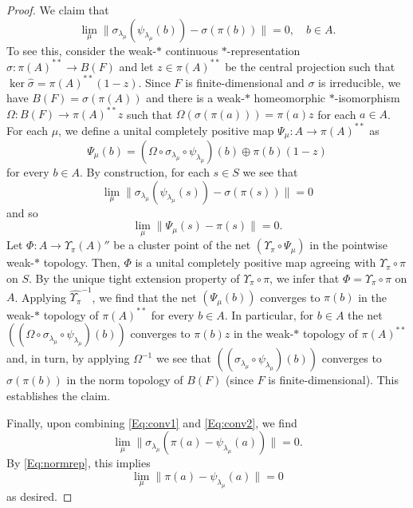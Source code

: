 \documentclass[10pt,a4paper]{amsart}
\begin{document}
\begin{proof}
We claim that 
\begin{equation}\label{Eq:conv2}
\lim_\mu \|\sigma_{\lambda_\mu}(\psi_{\lambda_\mu}(b))-\sigma(\pi(b))\|=0, \quad b\in A.
\end{equation}
To see this, consider the weak-$*$ continuous $*$-representation $\widehat\sigma:\pi(A)^{**}\to B(F)$ and let $z\in \pi(A)^{**}$ be the central projection such that $\ker \widehat\sigma=\pi(A)^{**}(1-z)$. Since $F$ is finite-dimensional and $\sigma$ is irreducible, we have $B(F)=\sigma(\pi(A))$ and there is a weak-$*$ homeomorphic $*$-isomorphism $\Omega:B(F)\to \pi(A)^{**}z$ such that $\Omega(\sigma(\pi(a)))=\pi(a)z$ for each $a\in A$.  For each $\mu$, we define a unital completely positive map $\Psi_\mu:A\to \pi(A)^{**}$ as
\[
\Psi_\mu(b)=(\Omega\circ \sigma_{\lambda_\mu} \circ \psi_{\lambda_\mu})(b)\oplus \pi(b)(1-z)
\]
for every $b\in A$. By construction, for each $s\in S$ we see that
\[
\lim_\mu \|\sigma_{\lambda_\mu}(\psi_{\lambda_\mu}(s))-\sigma(\pi(s))\|=0
\]
and so
\[
\lim_\mu \|\Psi_\mu(s)-\pi(s)\|=0.
\]
Let $\Phi:A\to \Upsilon_\pi(A)''$ be a cluster point of the net $(\Upsilon_\pi\circ \Psi_\mu)$ in the pointwise weak-$*$ topology. Then, $\Phi$ is a unital completely positive map agreeing with $\Upsilon_\pi\circ \pi$ on $S$. By the unique tight extension property of $\Upsilon_\pi\circ \pi$, we infer that $\Phi=\Upsilon_\pi\circ \pi$ on $A$. Applying $\widehat{\Upsilon_\pi}^{-1}$, we find that the net $(\Psi_\mu(b))$ converges to $\pi(b)$ in the weak-$*$ topology of $\pi(A)^{**}$ for every $b\in A$. In particular,  for $b\in A$ the net $((\Omega\circ \sigma_{\lambda_\mu} \circ \psi_{\lambda_\mu})(b))$ converges to $\pi(b)z$  in the weak-$*$ topology of $\pi(A)^{**}$ and, in turn, by applying $\Omega^{-1}$ we see that $((\sigma_{\lambda_\mu} \circ \psi_{\lambda_\mu})(b))$ converges to $\sigma(\pi(b))$  in the norm topology of $B(F)$ (since $F$ is finite-dimensional). This establishes the claim.

Finally, upon combining \eqref{Eq:conv1} and \eqref{Eq:conv2}, we find 
\[
\lim_\mu \|\sigma_{\lambda_\mu}(\pi(a)-\psi_{\lambda_\mu}(a))\|=0.
\]
By \eqref{Eq:normrep}, this implies 
\[
\lim_\mu \|\pi(a)-\psi_{\lambda_\mu}(a)\|=0
\]
as desired.

\end{proof}
\end{document}

